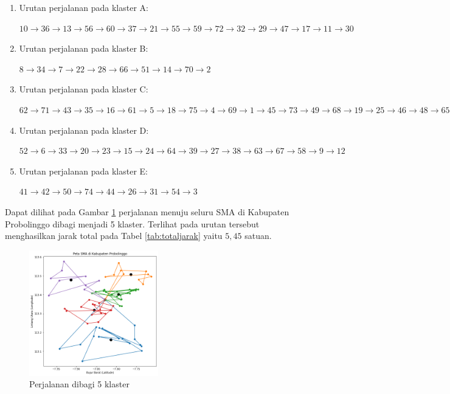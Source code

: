 \begin{enumerate}

\item Urutan perjalanan pada klaster A:

$10\rightarrow36\rightarrow13\rightarrow56\rightarrow60\rightarrow37\rightarrow21\rightarrow55\rightarrow59\rightarrow72\rightarrow32\rightarrow29\rightarrow47\rightarrow17\rightarrow11\rightarrow30$

\item Urutan perjalanan pada klaster B:

$8\rightarrow34\rightarrow7\rightarrow22\rightarrow28\rightarrow66\rightarrow51\rightarrow14\rightarrow70\rightarrow2$

\item Urutan perjalanan pada klaster C:

$62\rightarrow71\rightarrow43\rightarrow35\rightarrow16\rightarrow61\rightarrow5\rightarrow18\rightarrow75\rightarrow4\rightarrow69\rightarrow1\rightarrow45\rightarrow73\rightarrow49\rightarrow68\rightarrow19\rightarrow25\rightarrow46\rightarrow48\rightarrow65\rightarrow40\rightarrow53\rightarrow57$

\item Urutan perjalanan pada klaster D:

$52\rightarrow6\rightarrow33\rightarrow20\rightarrow23\rightarrow15\rightarrow24\rightarrow64\rightarrow39\rightarrow27\rightarrow38\rightarrow63\rightarrow67\rightarrow58\rightarrow9\rightarrow12$

\item Urutan perjalanan pada klaster E:

$41\rightarrow42\rightarrow50\rightarrow74\rightarrow44\rightarrow26\rightarrow31\rightarrow54\rightarrow3$

\end{enumerate}

Dapat dilihat pada Gambar \ref{fig:hasil_mtsp5} perjalanan menuju seluru SMA di Kabupaten Probolinggo dibagi menjadi 5 klaster. Terlihat pada urutan tersebut menghasilkan jarak total pada Tabel \ref{tab:totaljarak} yaitu $5,45$ satuan.

\begin{figure}[H]
\centering
\includegraphics[width=0.5\textwidth]{Gambar/hasil_mtsp/5}
\caption{Perjalanan dibagi 5 klaster}
\label{fig:hasil_mtsp5}
\end{figure}

